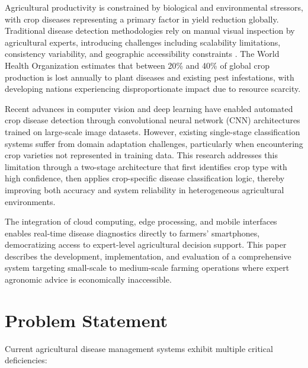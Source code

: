 \documentclass[conference]{IEEEtran}
\begin{document}
Agricultural productivity is constrained by biological and environmental stressors, with crop diseases representing a primary factor in yield reduction globally. Traditional disease detection methodologies rely on manual visual inspection by agricultural experts, introducing challenges including scalability limitations, consistency variability, and geographic accessibility constraints \cite{ref01}. The World Health Organization estimates that between 20\% and 40\% of global crop production is lost annually to plant diseases and existing pest infestations, with developing nations experiencing disproportionate impact due to resource scarcity.

Recent advances in computer vision and deep learning have enabled automated crop disease detection through convolutional neural network (CNN) architectures trained on large-scale image datasets. However, existing single-stage classification systems suffer from domain adaptation challenges, particularly when encountering crop varieties not represented in training data. This research addresses this limitation through a two-stage architecture that first identifies crop type with high confidence, then applies crop-specific disease classification logic, thereby improving both accuracy and system reliability in heterogeneous agricultural environments.

The integration of cloud computing, edge processing, and mobile interfaces enables real-time disease diagnostics directly to farmers' smartphones, democratizing access to expert-level agricultural decision support. This paper describes the development, implementation, and evaluation of a comprehensive system targeting small-scale to medium-scale farming operations where expert agronomic advice is economically inaccessible.

\section{Problem Statement}
\label{sec:problem}

Current agricultural disease management systems exhibit multiple critical deficiencies:
\end{document}
